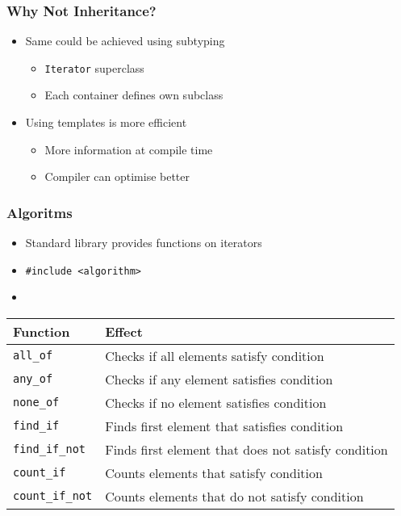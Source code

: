 \begin{frame}
  \frametitle{Why Not Inheritance?}
  \begin{itemize}
    \item Same could be achieved using subtyping
          \begin{itemize}
            \item \texttt{Iterator} superclass
            \item Each container defines own subclass
          \end{itemize}
    \item Using templates is more efficient
          \begin{itemize}
            \item More information at compile time
            \item Compiler can optimise better
          \end{itemize}
  \end{itemize}
\end{frame}

\begin{frame}
  \frametitle{Algoritms}
  \begin{itemize}
    \item Standard library provides functions on iterators
    \item \texttt{\#include <algorithm>}
    \item {}
  \end{itemize}
  \begin{center}
    \begin{tabular}{ll}
      \textbf{Function} & \textbf{Effect} \\
      \toprule
      \texttt{all\_of}          & Checks if all elements satisfy condition \\
      \texttt{any\_of}          & Checks if any element satisfies condition \\
      \texttt{none\_of}         & Checks if no element satisfies condition \\
      \texttt{find\_if}         & Finds first element that satisfies condition \\
      \texttt{find\_if\_not}    & Finds first element that does not satisfy condition \\
      \texttt{count\_if}        & Counts elements that satisfy condition \\
      \texttt{count\_if\_not}   & Counts elements that do not satisfy condition \\
    \end{tabular}
  \end{center}
\end{frame}

